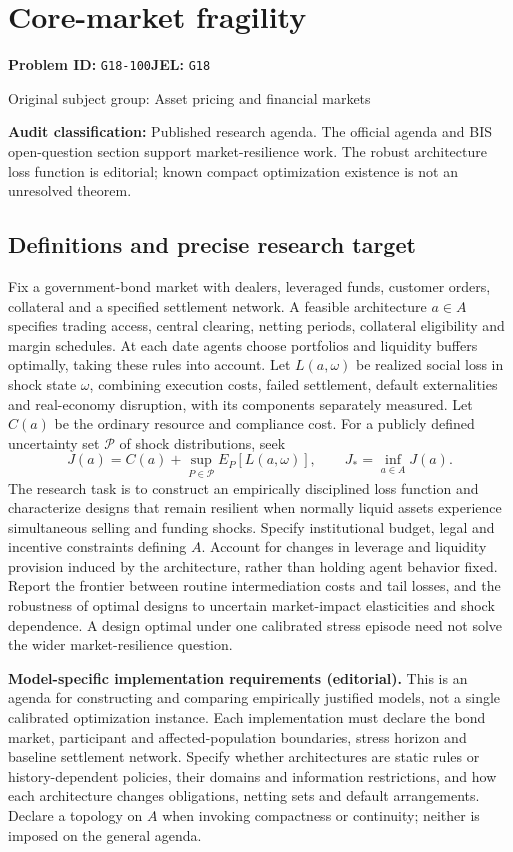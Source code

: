 \documentclass[11pt,a4paper]{article}
\begin{document}
\section*{Core-market fragility}
\textbf{Problem ID:} \texttt{G18-100}\quad \textbf{JEL:} \texttt{G18}\par
\label{problem:OP-0317}
{\sffamily\small\color{muted}Original subject group: Asset pricing and financial markets\par}
\label{definitions:problem:30007599}
\textbf{Audit classification:} Published research agenda. The official agenda and BIS open-question section support market-resilience work. The robust architecture loss function is editorial; known compact optimization existence is not an unresolved theorem.
\subsection*{Definitions and precise research target}
Fix a government-bond market with dealers, leveraged funds, customer orders, collateral and a specified settlement network. A feasible architecture \(a\in A\) specifies trading access, central clearing, netting periods, collateral eligibility and margin schedules. At each date agents choose portfolios and liquidity buffers optimally, taking these rules into account. Let \(L(a,\omega)\) be realized social loss in shock state \(\omega\), combining execution costs, failed settlement, default externalities and real-economy disruption, with its components separately measured. Let \(C(a)\) be the ordinary resource and compliance cost. For a publicly defined uncertainty set \(\mathcal P\) of shock distributions, seek
\[J(a)=C(a)+\sup_{P\in\mathcal P}E_P[L(a,\omega)],\qquad J_*=\inf_{a\in A}J(a).\]
The research task is to construct an empirically disciplined loss function and characterize designs that remain resilient when normally liquid assets experience simultaneous selling and funding shocks. Specify institutional budget, legal and incentive constraints defining \(A\). Account for changes in leverage and liquidity provision induced by the architecture, rather than holding agent behavior fixed. Report the frontier between routine intermediation costs and tail losses, and the robustness of optimal designs to uncertain market-impact elasticities and shock dependence. A design optimal under one calibrated stress episode need not solve the wider market-resilience question.

\textbf{Model-specific implementation requirements (editorial).} This is an agenda for constructing and comparing empirically justified models, not a single calibrated optimization instance. Each implementation must declare the bond market, participant and affected-population boundaries, stress horizon and baseline settlement network. Specify whether architectures are static rules or history-dependent policies, their domains and information restrictions, and how each architecture changes obligations, netting sets and default arrangements. Declare a topology on \(A\) when invoking compactness or continuity; neither is imposed on the general agenda.
\end{document}
